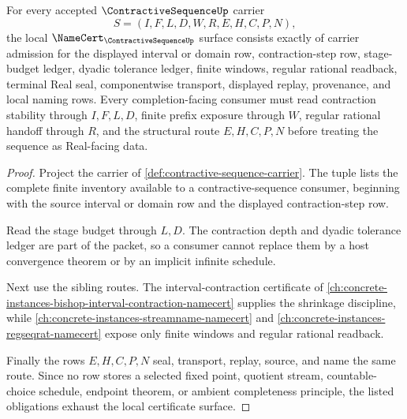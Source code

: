 \begin{theorem}
\label{thm:contractive-sequence-namecert-obligations}
For every accepted $\ContractiveSequenceUp$ carrier
$$
S=(I,F,L,D,W,R,E,H,C,P,N),
$$
the local $\NameCert_{\ContractiveSequenceUp}$ surface consists exactly of carrier admission for the displayed interval or domain row, contraction-step row, stage-budget ledger, dyadic tolerance ledger, finite windows, regular rational readback, terminal Real seal, componentwise transport, displayed replay, provenance, and local naming rows. Every completion-facing consumer must read contraction stability through $I,F,L,D$, finite prefix exposure through $W$, regular rational handoff through $R$, and the structural route $E,H,C,P,N$ before treating the sequence as Real-facing data.
\end{theorem}
\begin{proof}
Project the carrier of \autoref{def:contractive-sequence-carrier}. The tuple lists the complete finite inventory available to a contractive-sequence consumer, beginning with the source interval or domain row and the displayed contraction-step row.

Read the stage budget through $L,D$. The contraction depth and dyadic tolerance ledger are part of the packet, so a consumer cannot replace them by a host convergence theorem or by an implicit infinite schedule.

Next use the sibling routes. The interval-contraction certificate of \autoref{ch:concrete-instances-bishop-interval-contraction-namecert} supplies the shrinkage discipline, while \autoref{ch:concrete-instances-streamname-namecert} and \autoref{ch:concrete-instances-regseqrat-namecert} expose only finite windows and regular rational readback.

Finally the rows $E,H,C,P,N$ seal, transport, replay, source, and name the same route. Since no row stores a selected fixed point, quotient stream, countable-choice schedule, endpoint theorem, or ambient completeness principle, the listed obligations exhaust the local certificate surface.
\end{proof}

